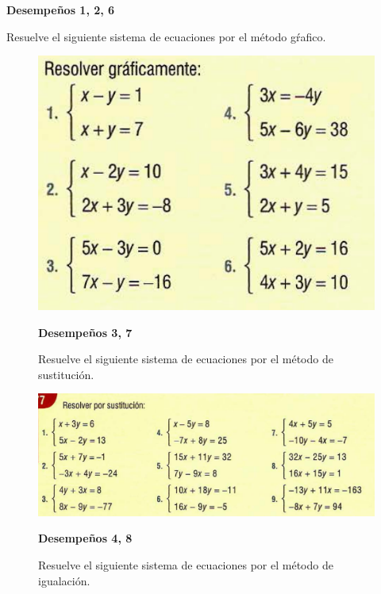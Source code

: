 \documentclass[spanish,12pt,a4paper]{article}
\begin{document}
	\begin{itemize}
		\item \textbf{Desempeños 1, 2, 6}
		
		Resuelve el siguiente sistema de ecuaciones por el método gŕafico.
		
		
		\begin{figure}[h]
			\includegraphics[scale = 0.5]{grafico.png}
		\end{figure}
	
		\begin{figure}[h]
		\item \textbf{Desempeños 3, 7}
		
		Resuelve el siguiente sistema de ecuaciones por el método de sustitución.
		
		
			\includegraphics[scale = 0.4]{sustitucion.png}
		\end{figure}

		\begin{figure}[h]
		\item \textbf{Desempeños 4, 8}
		
		Resuelve el siguiente sistema de ecuaciones por el método de igualación.
		

\end{figure}
\end{itemize}
\end{document}
